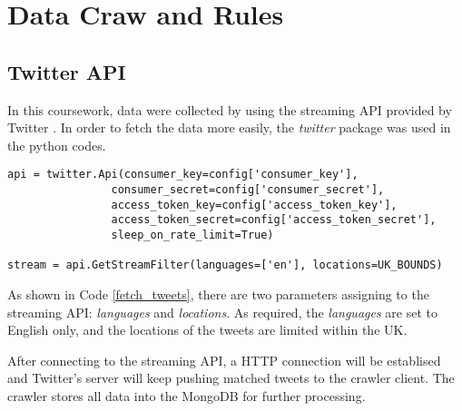 \section{Data Craw and Rules}

\subsection{Twitter API}

In this coursework, data were collected by using the streaming API provided by Twitter \cite{twitter_streaming}. In order to fetch the data more easily, the \textit{twitter} package was used in the python codes.


\begin{lstlisting}[caption={Fetch Tweets},captionpos=b,label={fetch_tweets}]
api = twitter.Api(consumer_key=config['consumer_key'],
                consumer_secret=config['consumer_secret'],
                access_token_key=config['access_token_key'],
                access_token_secret=config['access_token_secret'],
                sleep_on_rate_limit=True)

stream = api.GetStreamFilter(languages=['en'], locations=UK_BOUNDS)
\end{lstlisting}

As shown in Code \ref{fetch_tweets}, there are two parameters assigning to the streaming API: \textit{languages} and \textit{locations}. As required, the \textit{languages} are set to English only, and the locations of the tweets are limited within the UK.

After connecting to the streaming API, a HTTP connection will be establised and Twitter's server will keep pushing matched tweets to the crawler client. The crawler stores all data into the MongoDB for further processing.
